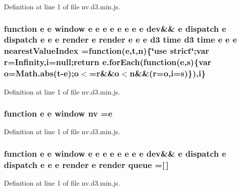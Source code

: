 Definition at line 1 of file nv.\+d3.\+min.\+js.

\subsubsection[{nearest\+Value\+Index}]{\setlength{\rightskip}{0pt plus 5cm}function {\bf e} {\bf e} {\bf window} {\bf e} {\bf e} {\bf e} {\bf e} {\bf e} {\bf e} {\bf e} {\bf e} {\bf dev}\&\& {\bf e} {\bf dispatch} {\bf e} {\bf dispatch} {\bf e} {\bf e} {\bf e} {\bf render} {\bf e} {\bf render} {\bf e} {\bf e} {\bf e} {\bf d3} time {\bf d3} time {\bf e} {\bf e} {\bf e} nearest\+Value\+Index =function({\bf e},t,{\bf n})\{\char`\"{}use strict\char`\"{};var {\bf r}=Infinity,{\bf i}=null;{\bf return} {\bf e.\+for\+Each}(function({\bf e},s)\{var {\bf o}=Math.\+abs(t-\/{\bf e});{\bf o}$<$={\bf r}\&\&{\bf o}$<${\bf n}\&\&({\bf r}={\bf o},{\bf i}=s)\}),{\bf i}\}}\label{nv_8d3_8min_8js_a4d69a13dc6badbf120c6ef5dbb536c3c}


Definition at line 1 of file nv.\+d3.\+min.\+js.

\subsubsection[{nv}]{\setlength{\rightskip}{0pt plus 5cm}function {\bf e} {\bf e} {\bf window} nv ={\bf e}}\label{nv_8d3_8min_8js_ae818ef7b3e73dcbb3d279a7475717808}


Definition at line 1 of file nv.\+d3.\+min.\+js.

\subsubsection[{queue}]{\setlength{\rightskip}{0pt plus 5cm}function {\bf e} {\bf e} {\bf window} {\bf e} {\bf e} {\bf e} {\bf e} {\bf e} {\bf e} {\bf e} {\bf e} {\bf dev}\&\& {\bf e} {\bf dispatch} {\bf e} {\bf dispatch} {\bf e} {\bf e} {\bf e} {\bf render} {\bf e} {\bf render} queue =[$\,$]}\label{nv_8d3_8min_8js_a3f138dd01db50e245891e77284edb589}


Definition at line 1 of file nv.\+d3.\+min.\+js.

